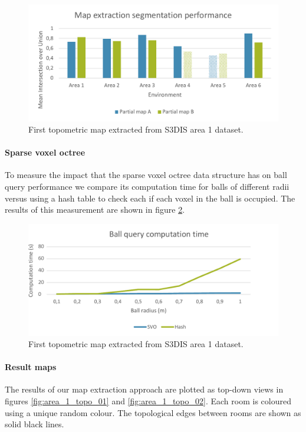 \begin{figure}[h]
    \centering
    \includegraphics*[width=\textwidth]{./fig/map_extract_chart.pdf}
    \caption{First topometric map extracted from S3DIS area 1 dataset.}
    \label{fig:map_extract_perf}
\end{figure}

\paragraph{Sparse voxel octree}
To measure the impact that the sparse voxel octree data structure has on ball query performance we compare its computation time for balls of different radii versus using a hash table to check each if each voxel in the ball is occupied. The results of this measurement are shown in figure \ref{fig:svo_perf}.

\begin{figure}[h]
    \centering
    \includegraphics*[width=\textwidth]{./fig/svo_chart.pdf}
    \caption{First topometric map extracted from S3DIS area 1 dataset.}
    \label{fig:svo_perf}
\end{figure}

\paragraph{Result maps}
The results of our map extraction approach are plotted as top-down views in figures \ref{fig:area_1_topo_01} and \ref{fig:area_1_topo_02}. Each room is coloured using a unique random colour. The topological edges between rooms are shown as solid black lines.


